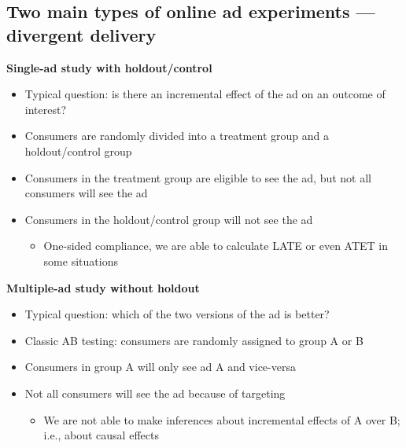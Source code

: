 \documentclass[10pt]{article}
\begin{document}
\subsection{Two main types of online ad experiments --- divergent delivery}
\textbf{Single-ad study with holdout/control}
\begin{itemize}
    \item Typical question: is there an incremental effect of the ad on an outcome of interest?
    \item Consumers are randomly divided into a treatment group and a holdout/control group 
    \item Consumers in the treatment group are eligible to see the ad, but not all consumers will see the ad 
    \item Consumers in the holdout/control group will not see the ad 
    \begin{itemize}
        \item One-sided compliance, we are able to calculate LATE or even ATET in some situations 
    \end{itemize}
\end{itemize}
\textbf{Multiple-ad study without holdout}
\begin{itemize}
    \item Typical question: which of the two versions of the ad is better?
    \item Classic AB testing: consumers are randomly assigned to group A or B
    \item Consumers in group A will only see ad A and vice-versa 
    \item Not all consumers will see the ad because of targeting 
    \begin{itemize}
        \item We are not able to make inferences about incremental effects of A over B; i.e., about causal effects 
    \end{itemize}
\end{itemize}
\end{document}
